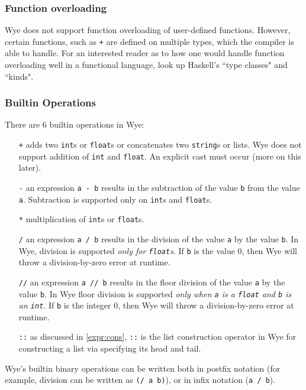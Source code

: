 \documentclass[a4paper, 12pt]{article}
\theoremstyle{myplain}
\theoremstyle{mydefinition}
\theoremstyle{myremark}
\numberwithin{equation} {section}
\numberwithin{figure}   {section}
\numberwithin{table}    {section}
\begin{document}
\subsubsection{Function overloading}
Wye does not support function overloading of user-defined functions. However, certain functions, such as \texttt{+} are defined on multiple types, which the compiler is able to handle. For an interested reader as to how one would handle function overloading well in a functional language, look up Haskell's ``type classes" and ``kinds".

\subsubsection{Builtin Operations}
There are 6 builtin operations in Wye:
\begin{itemize}
\item[\texttt{+}] adds two \texttt{int}s or \texttt{float}s or concatenates two \texttt{string}s or lists. Wye does not support addition of \texttt{int} and \texttt{float}. An explicit cast must occur (more on this later).
\item[\texttt{-}] an expression \texttt{a - b} results in the subtraction of the value \texttt{b} from the value \texttt{a}. Subtraction is supported only on \texttt{int}s and \texttt{float}s.
\item[\texttt{*}] multiplication of \texttt{int}s or \texttt{float}s.
\item[\texttt{/}] an expression \texttt{a / b} results in the division of the value \texttt{a} by the value \texttt{b}. In Wye, division is supported \textit{only for \texttt{float}s}. If \texttt{b} is the value 0, then Wye will throw a division-by-zero error at runtime.
\item[\texttt{//}] an expression \texttt{a // b} results in the floor division of the value \texttt{a} by the value \texttt{b}. In Wye floor division is supported \textit{only when \texttt{a} is a \texttt{float} and \texttt{b} is an \texttt{int}}. If \texttt{b} is the integer 0, then Wye will throw a division-by-zero error at runtime.
\item[\texttt{::}] as discussed in \ref{expr:cons}, \texttt{::} is the list construction operator in Wye for constructing a list via specifying its head and tail.
\end{itemize}

Wye's builtin binary operations can be written both in postfix notation (for example, division can be written as \texttt{(/ a b)}), or in infix notation (\texttt{a / b}).
\end{document}
